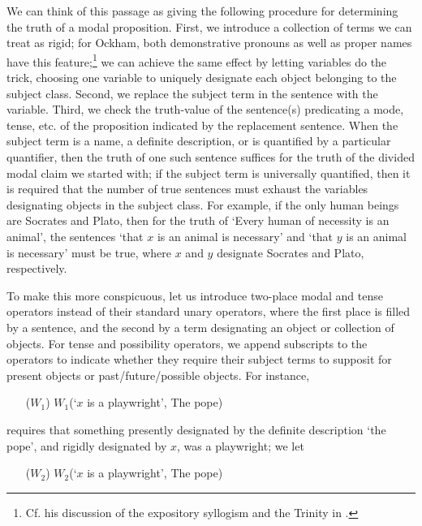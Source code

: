 	We can think of this passage as giving the following procedure for determining the truth of a modal proposition. First, we introduce a collection of terms we can treat as rigid; for Ockham, both demonstrative pronouns as well as proper names have this feature;\footnote{Cf. his discussion of the expository syllogism and the Trinity in \cite[II. 27, pp. 334-339]{OckhamSL}.} we can achieve the same effect by letting variables do the trick, choosing one variable to uniquely designate each object belonging to the subject class. Second, we replace the subject term in the sentence with the variable. Third, we check the truth-value of the sentence(s) predicating a mode, tense, etc. of the proposition indicated by the replacement sentence. When the subject term is a name, a definite description, or is quantified by a particular quantifier, then the truth of one such sentence suffices for the truth of the divided modal claim we started with; if the subject term is universally quantified, then it is required that the number of true sentences must exhaust the variables designating objects in the subject class. For example, if the only human beings are Socrates and Plato, then for the truth of `Every human of necessity is an animal', the sentences `that $x$ is an animal is necessary' and `that $y$ is an animal is necessary' must be true, where $x$ and $y$ designate Socrates and Plato, respectively.
	
	To make this more conspicuous, let us introduce two-place modal and tense operators instead of their standard unary operators, where the first place is filled by a sentence, and the second by a term designating an object or collection of objects. For tense and possibility operators, we append subscripts to the operators to indicate whether they require their subject terms to supposit for present objects or past/future/possible objects. For instance, 
	
	\begin{enumerate}
		\item[($W_{1}$)] $W_{1}$(`$x$ is a playwright', The pope)
	\end{enumerate}
	
	\noindent requires that something presently designated by the definite description `the pope', and rigidly designated by $x$, was a playwright; we let
	
	\begin{enumerate}
		\item[($W_{2}$)] $W_{2}$(`$x$ is a playwright', The pope)
	\end{enumerate}
	
